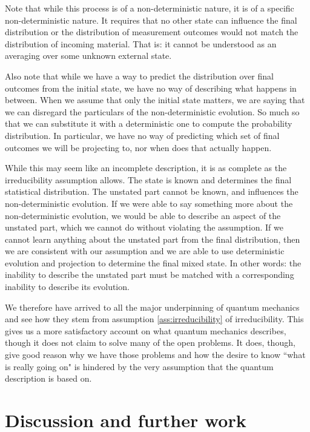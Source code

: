 \documentclass[aps,pra,10pt,twocolumn,floatfix,nofootinbib]{revtex4-1}
\numberwithin{equation}{section}
\theoremstyle{definition}
\begin{document}
Note that while this process is of a non-deterministic nature, it is of a specific non-deterministic nature. It requires that no other state can influence the final distribution or the distribution of measurement outcomes would not match the distribution of incoming material. That is: it cannot be understood as an averaging over some unknown external state.

Also note that while we have a way to predict the distribution over final outcomes from the initial state, we have no way of describing what happens in between. When we assume that only the initial state matters, we are saying that we can disregard the particulars of the non-deterministic evolution. So much so that we can substitute it with a deterministic one to compute the probability distribution. In particular, we have no way of predicting which set of final outcomes we will be projecting to, nor when does that actually happen.

While this may seem like an incomplete description, it is as complete as the irreducibility assumption allows. The state is known and determines the final statistical distribution. The unstated part cannot be known, and influences the non-deterministic evolution. If we were able to say something more about the non-deterministic evolution, we would be able to describe an aspect of the unstated part, which we cannot do without violating the assumption. If we cannot learn anything about the unstated part from the final distribution, then we are consistent with our assumption and we are able to use deterministic evolution and projection to determine the final mixed state. In other words: the inability to describe the unstated part must be matched with a corresponding inability to describe its evolution.

We therefore have arrived to all the major underpinning of quantum mechanics and see how they stem from assumption \ref{ass:irreducibility} of irreducibility. This gives us a more satisfactory account on what quantum mechanics describes, though it does not claim to solve many of the open problems. It does, though, give good reason why we have those problems and how the desire to know ``what is really going on" is hindered by the very assumption that the quantum description is based on.

\section{Discussion and further work}
\label{sec:discussion}
\end{document}

